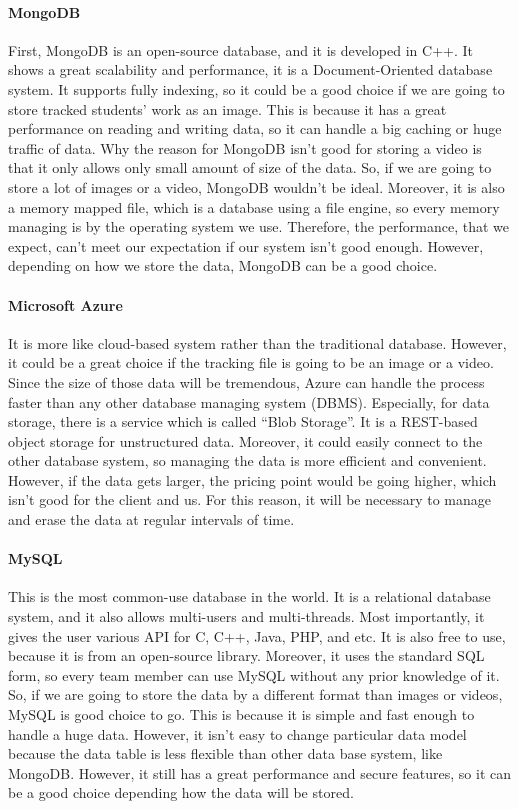 \documentclass[10pt]{article}
\begin{document}
            \paragraph{MongoDB}
                First, MongoDB is an open-source database, and it is developed in C++. It shows a great scalability and performance, it is a Document-Oriented database system. It supports fully indexing, so it could be a good choice if we are going to store tracked students’ work as an image. This is because it has a great performance on reading and writing data, so it can handle a big caching or huge traffic of data. Why the reason for MongoDB isn’t good for storing a video is that it only allows only small amount of size of the data. So, if we are going to store a lot of images or a video, MongoDB wouldn’t be ideal. Moreover, it is also a memory mapped file, which is a database using a file engine, so every memory managing is by the operating system we use. Therefore, the performance, that we expect, can’t meet our expectation if our system isn’t good enough. However, depending on how we store the data, MongoDB can be a good choice. \cite{mongo}
        
            \paragraph{Microsoft Azure}
                It is more like cloud-based system rather than the traditional database. However, it could be a great choice if the tracking file is going to be an image or a video. Since the size of those data will be tremendous, Azure can handle the process faster than any other database managing system (DBMS). Especially, for data storage, there is a service which is called “Blob Storage”. It is a REST-based object storage for unstructured data. Moreover, it could easily connect to the other database system, so managing the data is more efficient and convenient. However, if the data gets larger, the pricing point would be going higher, which isn’t good for the client and us. For this reason, it will be necessary to manage and erase the data at regular intervals of time. \cite{azure}
        
            \paragraph{MySQL}
                This is the most common-use database in the world. It is a relational database system, and it also allows multi-users and multi-threads. Most importantly, it gives the user various API for C, C++, Java, PHP, and etc. It is also free to use, because it is from an open-source library. Moreover, it uses the standard SQL form, so every team member can use MySQL without any prior knowledge of it. So, if we are going to store the data by a different format than images or videos, MySQL is good choice to go. This is because it is simple and fast enough to handle a huge data. However, it isn’t easy to change particular data model because the data table is less flexible than other data base system, like MongoDB. However, it still has a great performance and secure features, so it can be a good choice depending how the data will be stored. \cite{mysql}
        
\end{document}
